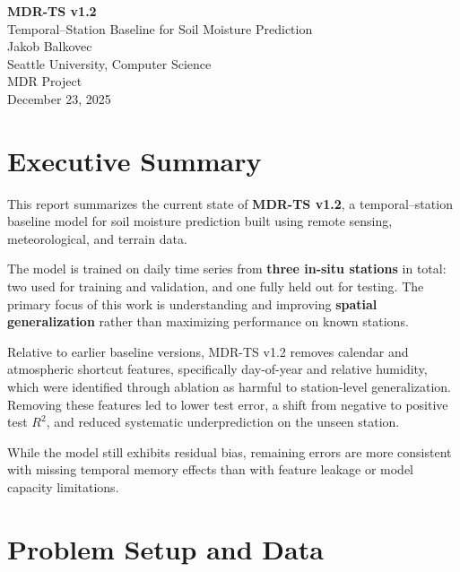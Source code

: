 \documentclass[11pt]{article}
\begin{document}
\begin{titlepage}
    \centering
    \vspace*{2.5cm}

    {\LARGE \textbf{MDR-TS v1.2}}\\[0.5cm]
    {\Large Temporal--Station Baseline for Soil Moisture Prediction}\\[1.5cm]

    {\large Jakob Balkovec}\\[0.3cm]
    {\large Seattle University, Computer Science}\\[0.3cm]
    {\large MDR Project}\\[2cm]

    {\large December 23, 2025}

    \vfill
\end{titlepage}

\section{Executive Summary}

This report summarizes the current state of \textbf{MDR-TS v1.2}, a temporal–station baseline model for soil moisture prediction built using remote sensing, meteorological, and terrain data.

The model is trained on daily time series from \textbf{three in-situ stations} in total: two used for training and validation, and one fully held out for testing. The primary focus of this work is understanding and improving \textbf{spatial generalization} rather than maximizing performance on known stations.

Relative to earlier baseline versions, MDR-TS v1.2 removes calendar and atmospheric shortcut features, specifically day-of-year and relative humidity, which were identified through ablation as harmful to station-level generalization. Removing these features led to lower test error, a shift from negative to positive test $R^2$, and reduced systematic underprediction on the unseen station.

While the model still exhibits residual bias, remaining errors are more consistent with missing temporal memory effects than with feature leakage or model capacity limitations.

\section{Problem Setup and Data}
\end{document}
